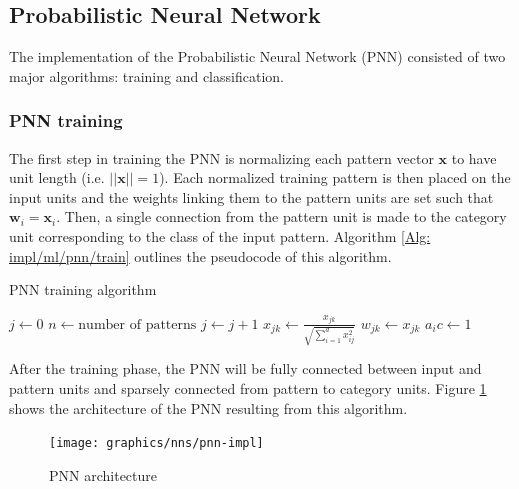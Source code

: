 	\subsection{Probabilistic Neural Network} \label{Section: impl/ml/pnn}
	The implementation of the Probabilistic Neural Network (PNN) consisted of two major algorithms: training and classification.
	\subsubsection*{PNN training}
	The first step in training the PNN is normalizing each pattern vector $\mathbf{x}$ to have unit length (i.e. $\vert\vert \mathbf{x}\vert\vert = 1$). Each normalized training pattern is then placed on the input units and the weights linking them to the pattern units are set such that $\mathbf{w}_i = \mathbf{x}_i$. Then, a single connection from the pattern unit is made to the category unit corresponding to the class of the input pattern. Algorithm \ref{Alg: impl/ml/pnn/train} outlines the pseudocode of this algorithm.
	\begin{algorithm}[H]
		\caption{PNN training algorithm}
		\label{Alg: impl/ml/pnn/train}
		\begin{algorithmic}
				\State $j \gets 0$
				\State $n \gets \text{number of patterns}$ 
				\Do
					\State $j \gets j + 1$
					\State $x_{jk} \gets \frac{x_{jk}}{\sqrt{\sum_{i=1}^{d}x_{ij}^2}}$ 
					\State $w_{jk} \gets x_{jk}$ 
						\State $a_ic \gets 1$
					\EndIf
			\EndProcedure
		\end{algorithmic}
	\end{algorithm}
	After the training phase, the PNN will be fully connected between input and pattern units and sparsely connected from pattern to category units. Figure \ref{Fig: impl/ml/pnn/architecture} shows the architecture of the PNN resulting from this algorithm.
	\begin{figure}[H]
		\centering
		\texttt{[image: graphics/nns/pnn-impl]}
		\caption{PNN architecture}
		\label{Fig: impl/ml/pnn/architecture}
	\end{figure}
